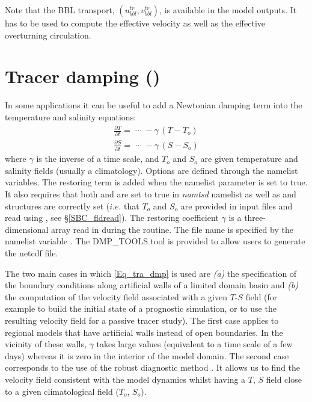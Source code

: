 \documentclass[NEMO_book]{subfiles}
\begin{document}
Note that the BBL transport, $( u^{tr}_{bbl}, v^{tr}_{bbl} )$, is available in 
the model outputs. It has to be used to compute the effective velocity 
as well as the effective overturning circulation.

\section  [Tracer damping (\textit{tradmp})]
		{Tracer damping ()}
\label{TRA_dmp}

In some applications it can be useful to add a Newtonian damping term 
into the temperature and salinity equations:
\begin{equation} \label{Eq_tra_dmp}
\begin{split}
 \frac{\partial T}{\partial t}=\;\cdots \;-\gamma \,\left( {T-T_o } \right)  \\
 \frac{\partial S}{\partial t}=\;\cdots \;-\gamma \,\left( {S-S_o } \right) 
 \end{split}
 \end{equation} 
where $\gamma$ is the inverse of a time scale, and $T_o$ and $S_o$ 
are given temperature and salinity fields (usually a climatology). 
Options are defined through the   namelist variables.
The restoring term is added when the namelist parameter  is set to true. 
It also requires that both  and  are set to true
in \textit{namtsd} namelist as well as  and  structures are 
correctly set  ($i.e.$ that $T_o$ and $S_o$ are provided in input files and read 
using , see \S\ref{SBC_fldread}). 
The restoring coefficient $\gamma$ is a three-dimensional array read in during the  routine. The file name is specified by the namelist variable . The DMP\_TOOLS tool is provided to allow users to generate the netcdf file.

The two main cases in which \eqref{Eq_tra_dmp} is used are \textit{(a)} 
the specification of the boundary conditions along artificial walls of a 
limited domain basin and \textit{(b)} the computation of the velocity 
field associated with a given $T$-$S$ field (for example to build the 
initial state of a prognostic simulation, or to use the resulting velocity 
field for a passive tracer study). The first case applies to regional 
models that have artificial walls instead of open boundaries. 
In the vicinity of these walls, $\gamma$ takes large values (equivalent to 
a time scale of a few days) whereas it is zero in the interior of the 
model domain. The second case corresponds to the use of the robust 
diagnostic method \citep{Sarmiento1982}. It allows us to find the velocity 
field consistent with the model dynamics whilst having a $T$, $S$ field 
close to a given climatological field ($T_o$, $S_o$). 
\end{document}
